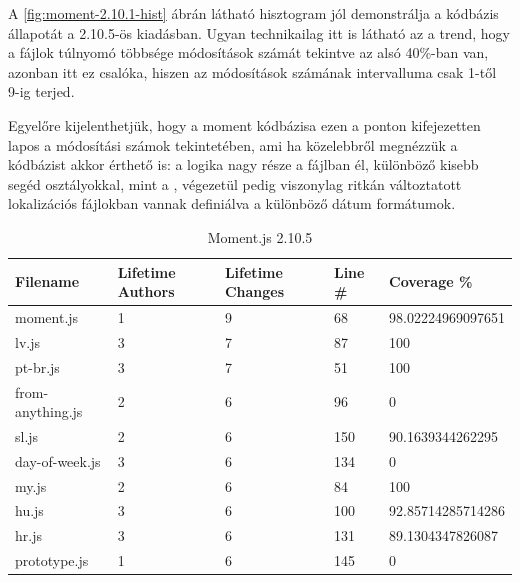 A \ref{fig:moment-2.10.1-hist} ábrán látható hisztogram jól demonstrálja a kódbázis állapotát a 2.10.5-ös kiadásban. Ugyan technikailag itt is látható az a trend, hogy a fájlok túlnyomó többsége módosítások számát tekintve az alsó 40\%-ban van, azonban itt ez csalóka, hiszen az módosítások számának intervalluma csak 1-től 9-ig terjed.

Egyelőre kijelenthetjük, hogy a moment kódbázisa ezen a ponton kifejezetten lapos a módosítási számok tekintetében, ami ha közelebbről megnézzük a kódbázist akkor érthető is: a logika nagy része a  fájlban él, különböző kisebb segéd osztályokkal, mint a , végezetül pedig viszonylag ritkán változtatott lokalizációs fájlokban vannak definiálva a különböző dátum formátumok.

\begin{table}[h]
    \centering
    \begin{tabular}{l|l|l|l|l}
        Filename         & Lifetime Authors & Lifetime Changes & Line \# & Coverage \%       \\ \hline
        moment.js        & 1                & 9                & 68      & 98.02224969097651 \\
        lv.js            & 3                & 7                & 87      & 100               \\
        pt-br.js         & 3                & 7                & 51      & 100               \\
        from-anything.js & 2                & 6                & 96      & 0                 \\
        sl.js            & 2                & 6                & 150     & 90.1639344262295  \\
        day-of-week.js   & 3                & 6                & 134     & 0                 \\
        my.js            & 2                & 6                & 84      & 100               \\
        hu.js            & 3                & 6                & 100     & 92.85714285714286 \\
        hr.js            & 3                & 6                & 131     & 89.1304347826087  \\
        prototype.js     & 1                & 6                & 145     & 0
    \end{tabular}
    \caption{Moment.js 2.10.5}
    \label{tab:moment-2105}
\end{table}

